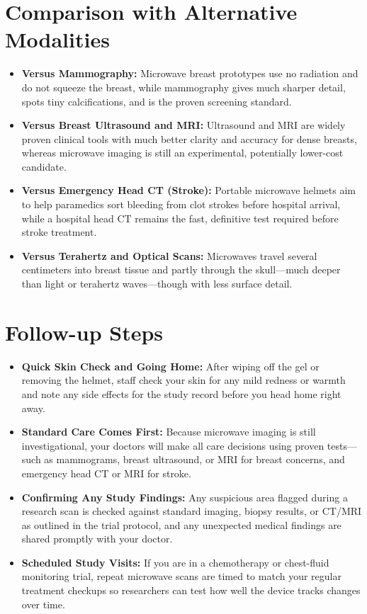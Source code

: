 \section{Comparison with Alternative Modalities}
\begin{itemize}
  \item \textbf{Versus Mammography:} Microwave breast prototypes use no radiation and do not squeeze the breast, while mammography gives much sharper detail, spots tiny calcifications, and is the proven screening standard.
  \item \textbf{Versus Breast Ultrasound and MRI:} Ultrasound and MRI are widely proven clinical tools with much better clarity and accuracy for dense breasts, whereas microwave imaging is still an experimental, potentially lower-cost candidate.
  \item \textbf{Versus Emergency Head CT (Stroke):} Portable microwave helmets aim to help paramedics sort bleeding from clot strokes before hospital arrival, while a hospital head CT remains the fast, definitive test required before stroke treatment.
  \item \textbf{Versus Terahertz and Optical Scans:} Microwaves travel several centimeters into breast tissue and partly through the skull---much deeper than light or terahertz waves---though with less surface detail.
\end{itemize}

\section{Follow-up Steps}
\begin{itemize}
  \item \textbf{Quick Skin Check and Going Home:} After wiping off the gel or removing the helmet, staff check your skin for any mild redness or warmth and note any side effects for the study record before you head home right away.
  \item \textbf{Standard Care Comes First:} Because microwave imaging is still investigational, your doctors will make all care decisions using proven tests---such as mammograms, breast ultrasound, or MRI for breast concerns, and emergency head CT or MRI for stroke.
  \item \textbf{Confirming Any Study Findings:} Any suspicious area flagged during a research scan is checked against standard imaging, biopsy results, or CT/MRI as outlined in the trial protocol, and any unexpected medical findings are shared promptly with your doctor.
  \item \textbf{Scheduled Study Visits:} If you are in a chemotherapy or chest-fluid monitoring trial, repeat microwave scans are timed to match your regular treatment checkups so researchers can test how well the device tracks changes over time.
\end{itemize}

